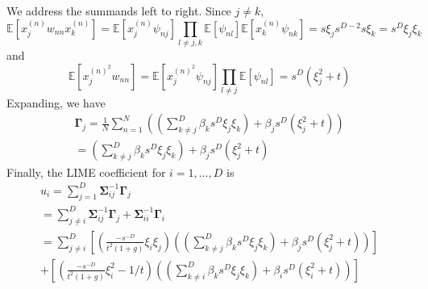             We address the summands left to right. Since $j\neq k$, 
            \begin{equation*}
                \mathds{E}[x^{(n)}_j w_{nn} x^{(n)}_k] = \mathds{E}[x^{(n)}_j\psi_{nj}]\prod_{l\neq j,k} \mathds{E}[\psi_{nl}] \mathds{E}[x^{(n)}_k\psi_{nk}] = s\xi_j s^{D-2} s\xi_k = s^D \xi_j \xi_k
            \end{equation*}
            and
            \[
            \mathds{E}[x^{{(n)}^2}_j w_{nn}] = \mathds{E}[x^{{(n)}^2}_j \psi_{nj}]\prod_{l\neq  j} \mathds{E}[\psi_{nl}] = s^D (\xi_j^2 + t)
            \]
    Expanding, we have
    \begin{gather*}
    \mathbf{\Gamma}_j = \frac{1}{N}\sum_{n=1}^N\left(\left(\sum_{k\neq j}^D\beta_ks^D \xi_j \xi_k \right) + \beta_j s^D (\xi_j^2 + t)\right) \\
    = \left(\sum_{k\neq j}^D\beta_ks^D \xi_j \xi_k \right) + \beta_j s^D (\xi_j^2 + t)
    \end{gather*} 
    Finally, the LIME coefficient for $i=1,\ldots,D$ is
    \begin{gather*}
        u_i = \sum_{j=1}^D \mathbf{\Sigma}_{ij}^{-1} \mathbf{\Gamma}_j \\
        = \sum_{j\neq i}^D \mathbf{\Sigma}_{ij}^{-1} \mathbf{\Gamma}_j +  \mathbf{\Sigma}_{ii}^{-1} \mathbf{\Gamma}_i \\
        = \sum_{j\neq i}^D \left[\left(\frac{-s^{-D}}{t^2(1+g)}\xi_i \xi_j\right)\left(\left(\sum_{k\neq j}^D\beta_ks^D \xi_j \xi_k \right) + \beta_j s^D (\xi_j^2 + t)\right)\right] \\ + \left[\left(\frac{-s^{-D}}{t^2(1+g)}\xi_i^2 - 1/t\right)\left(\left(\sum_{k\neq i}^D\beta_k s^D \xi_j \xi_k \right) + \beta_i s^D (\xi_i^2 + t)\right)\right]
    \end{gather*}
